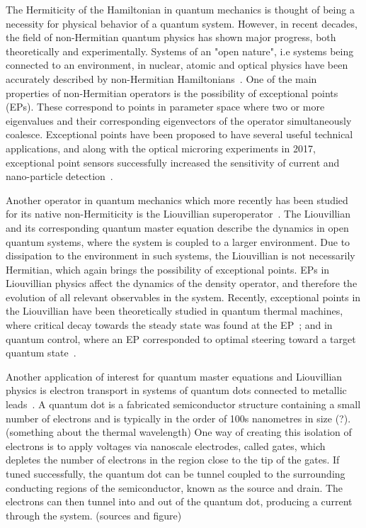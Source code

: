 \documentclass[../main.tex]{subfiles}
\begin{document}
The Hermiticity of the Hamiltonian in quantum mechanics is thought of being a necessity for physical behavior of a quantum system. However, in recent decades, the field of non-Hermitian quantum physics has shown major progress, both theoretically and experimentally. Systems of an "open nature", i.e systems being connected to an environment, in nuclear, atomic and optical physics have been accurately described by non-Hermitian Hamiltonians~\cite{nonHermrev}. One of the main properties of non-Hermitian operators is the possibility of exceptional points (EPs). These correspond to points in parameter space where two or more eigenvalues and their corresponding eigenvectors of the operator simultaneously coalesce. Exceptional points have been proposed to have several useful technical applications, and along with the optical microring experiments in 2017, exceptional point sensors successfully increased the sensitivity of current and nano-particle detection~\cite{microring1, microring2}.

Another operator in quantum mechanics which more recently has been studied for its native non-Hermiticity is the Liouvillian superoperator~\cite{recentliou, thermal, steering}. The Liouvillian and its corresponding quantum master equation describe the dynamics in open quantum systems, where the system is coupled to a larger environment. Due to dissipation to the environment in such systems, the Liouvillian is not necessarily Hermitian, which again brings the possibility of exceptional points. EPs in Liouvillian physics affect the dynamics of the density operator, and therefore the evolution of all relevant observables in the system. Recently, exceptional points in the Liouvillian have been theoretically studied in quantum thermal machines, where critical decay towards the steady state was found at the EP~\cite{thermal}; and in quantum control, where an EP corresponded to optimal steering toward a target quantum state~\cite{steering}. 

Another application of interest for quantum master equations and Liouvillian physics is electron transport in systems of quantum dots connected to metallic leads~\cite{qdottrans}. A quantum dot is a fabricated semiconductor structure containing a small number of electrons and is typically in the order of 100s nanometres in size (?). (something about the thermal wavelength) One way of creating this isolation of electrons is to apply voltages via nanoscale electrodes, called gates, which depletes the number of electrons in the region close to the tip of the gates. If tuned successfully, the quantum dot can be tunnel coupled to the surrounding conducting regions of the semiconductor, known as the source and drain. The electrons can then tunnel into and out of the quantum dot, producing a current through the system. (sources and figure)
\end{document}
